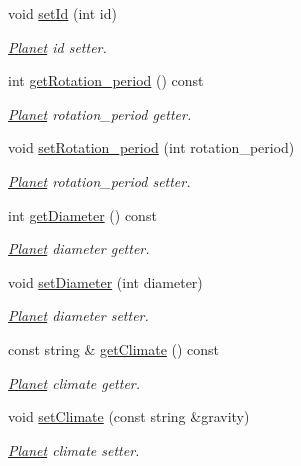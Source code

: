 \begin{DoxyCompactItemize}
void \hyperlink{class_planet_a7d7dda816ee836db4e7970a4f3d37335}{set\+Id} (int id)
\begin{DoxyCompactList}\small\item\em \hyperlink{class_planet}{Planet} id setter. \end{DoxyCompactList}\item 
int \hyperlink{class_planet_a4f49642d968d2049185eef83c381d570}{get\+Rotation\+\_\+period} () const
\begin{DoxyCompactList}\small\item\em \hyperlink{class_planet}{Planet} rotation\+\_\+period getter. \end{DoxyCompactList}\item 
void \hyperlink{class_planet_a90228c089e9603f53d736dec4ce6ccf9}{set\+Rotation\+\_\+period} (int rotation\+\_\+period)
\begin{DoxyCompactList}\small\item\em \hyperlink{class_planet}{Planet} rotation\+\_\+period setter. \end{DoxyCompactList}\item 
int \hyperlink{class_planet_a07e8d450fcdb6041c76b6ea3658c1f4b}{get\+Diameter} () const
\begin{DoxyCompactList}\small\item\em \hyperlink{class_planet}{Planet} diameter getter. \end{DoxyCompactList}\item 
void \hyperlink{class_planet_aff945fd3df2601899e532134f7d9718e}{set\+Diameter} (int diameter)
\begin{DoxyCompactList}\small\item\em \hyperlink{class_planet}{Planet} diameter setter. \end{DoxyCompactList}\item 
const string \& \hyperlink{class_planet_a5be43de032f120076dbd714b3ed9fe6b}{get\+Climate} () const
\begin{DoxyCompactList}\small\item\em \hyperlink{class_planet}{Planet} climate getter. \end{DoxyCompactList}\item 
void \hyperlink{class_planet_a77ae00b49eba800190e8dea28c2070d8}{set\+Climate} (const string \&gravity)
\begin{DoxyCompactList}\small\item\em \hyperlink{class_planet}{Planet} climate setter. \end{DoxyCompactList}\item 

\end{DoxyCompactItemize}
